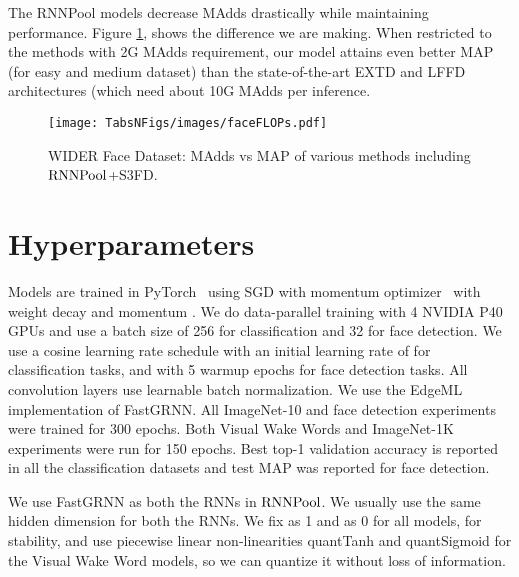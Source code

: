 \documentclass[10pt]{article}
\newcommand{\rpool}{\ensuremath{{\rm RNNPool}}\xspace}
\begin{document}
The RNNPool models decrease MAdds drastically while maintaining performance. Figure \ref{fig:facedetection}, shows the difference we are making. When restricted to the methods with 2G MAdds requirement, our model attains even better MAP (for easy and medium dataset) than the state-of-the-art EXTD and LFFD architectures (which need about  10G MAdds per inference.
\begin{figure*}[h]
	\texttt{[image: TabsNFigs/images/faceFLOPs.pdf]}
	\caption{WIDER Face Dataset: MAdds  vs MAP of various methods including \rpool+S3FD.}
	\label{fig:facedetection}
	\vspace{-5mm}
\end{figure*}  
\section{Hyperparameters}
\label{sec:hyperparams}
Models are trained in PyTorch~\citep{paszke2019pytorch} using SGD with
momentum optimizer~\citep{sutskever2013importance} with weight decay
 and momentum .  We do data-parallel training
with 4 NVIDIA P40 GPUs and use a batch size of 256 for classification
and 32 for face detection.  We use a cosine learning rate schedule
with an initial learning rate of  for classification tasks, and
 with 5 warmup epochs for face detection tasks. All convolution
layers use learnable batch normalization. We use the
EdgeML~\citep{edgeml04} implementation of FastGRNN. All ImageNet-10 and face detection
experiments were trained for 300 epochs. Both Visual Wake Words and ImageNet-1K experiments were run for 150 epochs. Best top-1 validation accuracy is reported in all the classification datasets and test MAP was reported for face detection. 

We use FastGRNN as both the RNNs in \rpool. We usually use the same hidden
dimension for both the RNNs. We fix  as 1 and  as 0 for
all models, for stability, and use piecewise linear non-linearities
quantTanh and quantSigmoid for the Visual Wake Word models, so we can
quantize it without loss of information.
\end{document}
